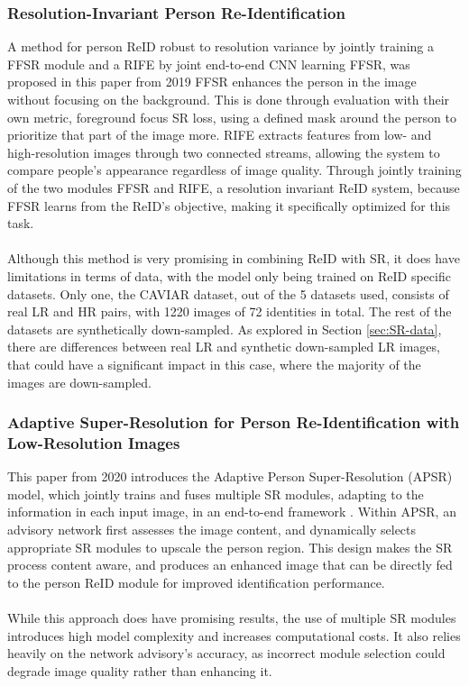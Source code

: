 \subsubsection{Resolution-Invariant Person Re-Identification} 

A method for person \acs{ReID} robust to resolution variance by jointly training a \acf{FFSR} module and a \acf{RIFE} by joint end-to-end \acs{CNN} learning \acs{FFSR}, was proposed in this paper from 2019 \cite{mao2019ffsr} \acs{FFSR} enhances the person in the image without focusing on the background. This is done through evaluation with their own metric, foreground focus \acs{SR} loss, using a defined mask around the person to prioritize that part of the image more. \acs{RIFE} extracts features from low- and high-resolution images through two connected streams, allowing the system to compare people’s appearance regardless of image quality. Through jointly training of the two modules \acs{FFSR} and \acs{RIFE}, a resolution invariant \acs{ReID} system, because \acs{FFSR} learns from the \acs{ReID}'s objective, making it specifically optimized for this task. 
\\\\
Although this method is very promising in combining \acs{ReID} with \acs{SR}, it does have limitations in terms of data, with the model only being trained on \acs{ReID} specific datasets. Only one, the CAVIAR dataset,\cite{cheng2005caviar} out of the 5 datasets used, consists of real \acs{LR} and \acs{HR} pairs, with 1220 images of 72 identities in total. The rest of the datasets are synthetically down-sampled. As explored in Section \ref{sec:SR-data}, there are differences between real \acs{LR} and synthetic down-sampled \acs{LR} images,\cite{Wang2021RealESRGAN,Wei2020DRealSR} that could have a significant impact in this case, where the majority of the images are down-sampled.

\subsubsection{Adaptive Super-Resolution for Person Re-Identification with Low-Resolution Images}
This paper from 2020 introduces the Adaptive Person Super-Resolution (APSR) model, which jointly trains and fuses multiple \acs{SR} modules, adapting to the information in each input image, in an end-to-end framework \cite{APSR}. Within APSR, an advisory network first assesses the image content, and dynamically selects appropriate SR modules to upscale the person region. This design makes the \acs{SR} process content aware, and produces an enhanced image that can be directly fed to the person \acs{ReID} module for improved identification performance.
\\\\
While this approach does have promising results, the use of multiple \acs{SR} modules introduces high model complexity and increases computational costs. It also relies heavily on the network advisory's accuracy, as incorrect module selection could degrade image quality rather than enhancing it. 

